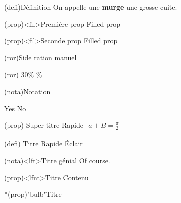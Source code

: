 \documentclass[a4paper, 10pt, garamond]{book}
\begin{document}
\begin{tcb}(defi){Définition}
	On appelle une \textbf{murge} une grosse cuite.
\end{tcb}

\begin{tcb*}(prop)<fil>{Première prop}
	Filled prop
\end{tcb*}

\begin{tcb}(prop)<fil>{Seconde prop}
	Filled prop
\end{tcb}

\begin{tcb}(ror){Side ration manuel}
	\lipsum[1]
	\smallbreak
	\begin{isd}[righthand ratio=.7](ror)
		30\%
		\%
	\end{isd}
\end{tcb}

\begin{tcb*}(nota){Notation}
	\lipsum[1]
	\begin{isd}[cnt]
		Yes
		\tcblower
		No
	\end{isd}
	\lipsum[2]
\end{tcb*}

\sde[right](prop)
{Super titre}{
	Rapide
}{
	$
		\begin{gathered}
			a + B = \frac{\pi}{2}
		\end{gathered}
	$
}


(defi)
{Titre}{
	Rapide
}{
	Éclair
}

\sde[right, ](nota)<lft>{Titre génial}{
	\lipsum[2]
}{
	Of course.
}

\begin{tcb}(prop)<lfnt>{Titre}
	Contenu
\end{tcb}

\begin{tcb}*(prop)"bulb"{Titre}

\end{tcb}
\end{document}
